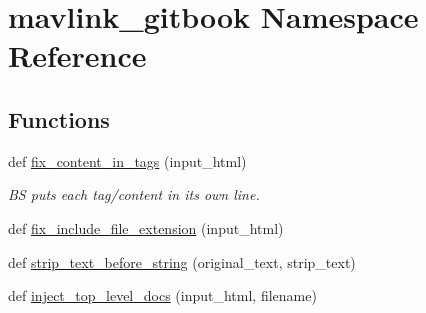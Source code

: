 \hypertarget{namespacemavlink__gitbook}{}\section{mavlink\+\_\+gitbook Namespace Reference}
\label{namespacemavlink__gitbook}
\subsection*{Functions}
\begin{DoxyCompactItemize}
\item 
def \mbox{\hyperlink{namespacemavlink__gitbook_a0401ef11ed769a42f321ee486f274039}{fix\+\_\+content\+\_\+in\+\_\+tags}} (input\+\_\+html)
\begin{DoxyCompactList}\small\item\em BS puts each tag/content in its own line. \end{DoxyCompactList}\item 
def \mbox{\hyperlink{namespacemavlink__gitbook_a9bc4614799f922b28688524e674ba96a}{fix\+\_\+include\+\_\+file\+\_\+extension}} (input\+\_\+html)
\item 
def \mbox{\hyperlink{namespacemavlink__gitbook_ac690fc1c1dea8fbf781656c303caace3}{strip\+\_\+text\+\_\+before\+\_\+string}} (original\+\_\+text, strip\+\_\+text)
\item 
def \mbox{\hyperlink{namespacemavlink__gitbook_aad1447f419d684664763e7e17fce7e2c}{inject\+\_\+top\+\_\+level\+\_\+docs}} (input\+\_\+html, filename)
\end{DoxyCompactItemize}
